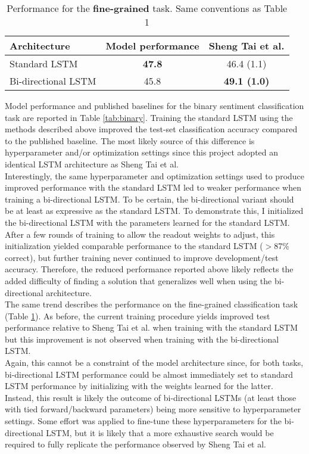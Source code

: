 \documentclass[a4paper]{article}
\begin{document}
\begin{table}
\centering
\begin{tabular}{l|c|c}
Architecture & Model performance & Sheng Tai et al. \\\hline
Standard LSTM & \textbf{47.8} & 46.4 (1.1) \\
Bi-directional LSTM & 45.8 & \textbf{49.1 (1.0)}
\end{tabular}
\caption{\label{tab:fine_grained}Performance for the \textbf{fine-grained} task. Same conventions as Table 1}
\end{table}

Model performance and published baselines for the binary sentiment classification task are reported in Table \ref{tab:binary}. Training the standard LSTM using the methods described above improved the test-set classification accuracy compared to the published baseline. The most likely source of this difference is hyperparameter and/or optimization settings since this project adopted an identical LSTM architecture as Sheng Tai et al.\\
Interestingly, the same hyperparameter and optimization settings used to produce improved performance with the standard LSTM led to weaker performance when training a bi-directional LSTM. To be certain, the bi-directional variant should be at least as expressive as the standard LSTM. To demonstrate this, I initialized the bi-directional LSTM with the parameters learned for the standard LSTM. After a few rounds of training to allow the readout weights to adjust, this initialization yielded comparable performance to the standard LSTM ($>$87\% correct), but further training never continued to improve development/test accuracy. Therefore, the reduced performance reported above likely reflects the added difficulty of finding a solution that generalizes well when using the bi-directional architecture.\\
The same trend describes the performance on the fine-grained classification task (Table \ref{tab:fine_grained}). As before, the current training procedure yields improved test performance relative to Sheng Tai et al. when training with the standard LSTM but this improvement is not observed when training with the bi-directional LSTM.\\
Again, this cannot be a constraint of the model architecture since, for both tasks, bi-directional LSTM performance could be almost immediately set to standard LSTM performance by initializing with the weights learned for the latter. Instead, this result is likely the outcome of bi-directional LSTMs (at least those with tied forward/backward parameters) being more sensitive to hyperparameter settings. Some effort was applied to fine-tune these hyperparameters for the bi-directional LSTM, but it is likely that a more exhaustive search would be required to fully replicate the performance observed by Sheng Tai et al.
\end{document}
